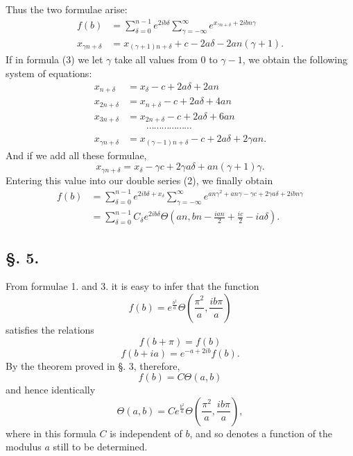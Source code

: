 \documentclass[10pt]{article}
\newcommand{\sourceanchor}[1]{\hypertarget{source-#1}{}}
\begin{document}
Thus the two formulae arise:
\begin{align}
 f(b)&=\sum_{\delta=0}^{n-1}e^{2ib\delta}\sum_{\gamma=-\infty}^{\infty}e^{x_{\gamma n+\delta}+2ibn\gamma} \tag{2}\\
 x_{\gamma n+\delta}&=x_{(\gamma+1)n+\delta}+c-2a\delta-2an(\gamma+1). \tag{3}
\end{align}
If in formula (3) we let \(\gamma\) take all values from 0 to \(\gamma-1\), we obtain the following system of equations:
\begin{align*}
 x_{n+\delta}&=x_{\delta}-c+2a\delta+2an\\
 x_{2n+\delta}&=x_{n+\delta}-c+2a\delta+4an\\
 x_{3n+\delta}&=x_{2n+\delta}-c+2a\delta+6an\\
 &\hspace{2em}\cdots\cdots\cdots\cdots\cdots\cdots\\
 x_{\gamma n+\delta}&=x_{(\gamma-1)n+\delta}-c+2a\delta+2\gamma an.
\end{align*}
And if we add all these formulae,
\[
x_{\gamma n+\delta}=x_{\delta}-\gamma c+2\gamma a\delta+an(\gamma+1)\gamma.
\]
Entering this value into our double series (2), we finally obtain
\begin{align*}
 f(b)&=\sum_{\delta=0}^{n-1}e^{2ib\delta+x_{\delta}}\sum_{\gamma=-\infty}^{\infty}e^{an\gamma^{2}+an\gamma-\gamma c+2\gamma a\delta+2ibn\gamma}\\
 &=\sum_{\delta=0}^{n-1}C_{\delta}e^{2ib\delta}\Theta\!\left(an,bn-\frac{ian}{2}+\frac{ic}{2}-ia\delta\right).
\end{align*}

\sourceanchor{PA06}
\subsection*{\S. 5.}
From formulae 1. and 3. it is easy to infer that the function
\[
f(b)=e^{\frac{b^{2}}{a}}\Theta\!\left(\frac{\pi^{2}}{a},\frac{ib\pi}{a}\right)
\]
satisfies the relations
\[
f(b+\pi)=f(b)
\]
\[
f(b+ia)=e^{-a+2ib}f(b).
\]
By the theorem proved in \S. 3, therefore,
\[
f(b)=C\Theta(a,b)
\]
and hence identically
\begin{equation*}
\Theta(a,b)=C e^{\frac{b^{2}}{a}}\Theta\!\left(\frac{\pi^{2}}{a},\frac{ib\pi}{a}\right),
\tag{1}
\end{equation*}
where in this formula \(C\) is independent of \(b\), and so denotes a function of the modulus \(a\) still to be determined.
\end{document}
